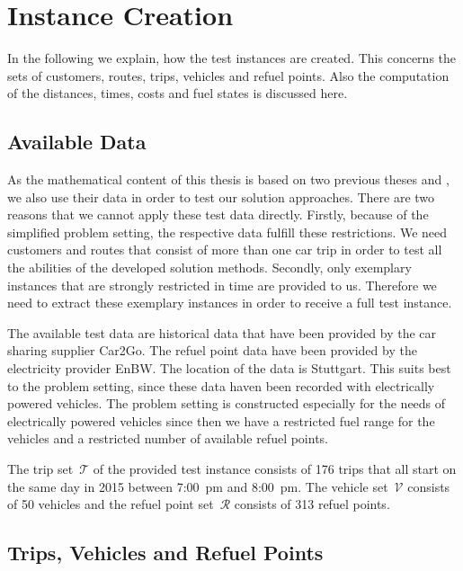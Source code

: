 \chapter{Instance Creation}
\label{ch:instance_creation}

In the following we explain, how the test instances are created. This concerns the sets of customers, routes, trips, vehicles and refuel points. Also the computation of the distances, times, costs and fuel states is discussed here. 

\section{Available Data}

As the mathematical content of this thesis is based on two previous theses \cite{Kaiser} and \cite{Knoll}, we also use their data in order to test our solution approaches. There are two reasons that we cannot apply these test data directly. Firstly, because of the simplified problem setting, the respective data fulfill these restrictions. We need customers and routes that consist of more than one car trip in order to test all the abilities of the developed solution methods. Secondly, only exemplary instances that are strongly restricted in time are provided to us. Therefore we need to extract these exemplary instances in order to receive a full test instance. 

The available test data are historical data that have been provided by the car sharing supplier Car2Go. The refuel point data have been provided by the electricity provider EnBW. The location of the data is Stuttgart. This suits best to the problem setting, since these data haven been recorded with electrically powered vehicles. The problem setting is constructed especially for the needs of electrically powered vehicles since then we have a restricted fuel range for the vehicles and a restricted number of available refuel points.

The trip set~$\mathcal{T}$ of the provided test instance consists of 176 trips that all start on the same day in 2015 between 7:00~pm and 8:00~pm. The vehicle set~$\mathcal{V}$ consists of 50 vehicles and the refuel point set~$\mathcal{R}$ consists of 313 refuel points.

\section{Trips, Vehicles and Refuel Points}
\label{sec:trip_creation}

